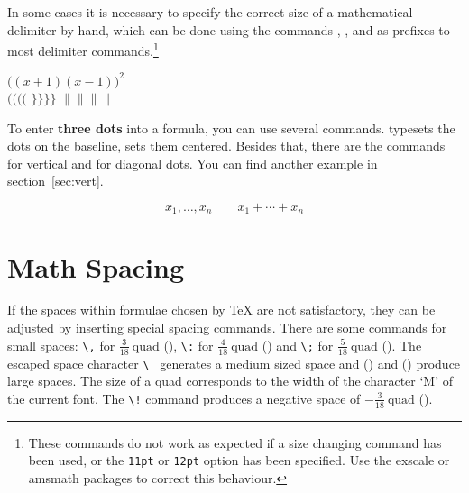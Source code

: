 In some cases it is necessary to specify the correct size of a
mathematical delimiter by hand,
which can be done using the commands , ,  and
 as prefixes to most delimiter commands.\footnote{These
  commands do not work as expected if a size changing command has been
  used, or the \texttt{11pt} or \texttt{12pt} option has been
  specified.  Use the exscale or amsmath packages to
  correct this behaviour.}

\begin{singlespace}
\begin{example}
$\Big( (x+1) (x-1) \Big) ^{2}$\\
$\big(\Big(\bigg(\Bigg($\quad
$\big\}\Big\}\bigg\}\Bigg\}$\quad
$\big\|\Big\|\bigg\|\Bigg\|$
\end{example}
\end{singlespace}

To enter \textbf{three dots} into a formula, you can use several
commands.  typesets the dots on the baseline, 
sets them centered. Besides that, there are the commands  for
vertical and  for diagonal dots. You can find another example in section~\ref{sec:vert}.

\begin{singlespace}
\begin{example}
\begin{displaymath}
x_{1},\ldots,x_{n} \qquad
x_{1}+\cdots+x_{n}
\end{displaymath}
\end{example}
\end{singlespace}
 
\section{Math Spacing}

 If the spaces within formulae chosen by \TeX{}
are not satisfactory, they can be adjusted by inserting special
spacing commands. There are some commands for small spaces: \verb|\,|  for
$\frac{3}{18}\:\textrm{quad}$ (\demowidth{0.166em}), \verb|\:|  for $\frac{4}{18}\:
\textrm{quad}$ (\demowidth{0.222em}) and \verb|\;|  for $\frac{5}{18}\:
\textrm{quad}$ (\demowidth{0.277em}).  The escaped space character
\verb*.\ . generates a medium sized space and 
(\demowidth{1em}) and  (\demowidth{2em}) produce large
spaces. The size of a quad corresponds to the width of the
character `M' of the current font.  The \verb|\!| command produces a
negative space of $-\frac{3}{18}\:\textrm{quad}$ (\demowidth{0.166em}).

